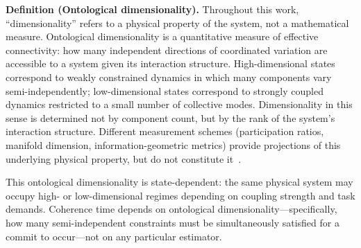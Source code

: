 \documentclass[12pt]{article}
\begin{document}
\noindent{}

\textbf{Definition (Ontological dimensionality).} Throughout this work, ``dimensionality'' refers to a physical property of the system, not a mathematical measure. Ontological dimensionality is a quantitative measure of effective connectivity: how many independent directions of coordinated variation are accessible to a system given its interaction structure. High-dimensional states correspond to weakly constrained dynamics in which many components vary semi-independently; low-dimensional states correspond to strongly coupled dynamics restricted to a small number of collective modes. Dimensionality in this sense is determined not by component count, but by the rank of the system's interaction structure. Different measurement schemes (participation ratios, manifold dimension, information-geometric metrics) provide projections of this underlying physical property, but do not constitute it~\cite{amari2016}.

This ontological dimensionality is state-dependent: the same physical system may occupy high- or low-dimensional regimes depending on coupling strength and task demands. Coherence time depends on ontological dimensionality---specifically, how many semi-independent constraints must be simultaneously satisfied for a commit to occur---not on any particular estimator.
\end{document}
